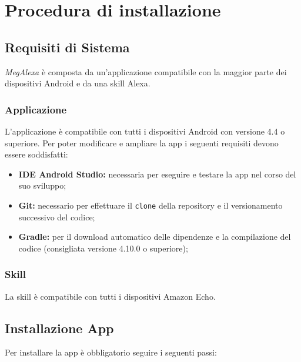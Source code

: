 \chapter{Procedura di installazione}

\section{Requisiti di Sistema}
\label{RequisitSistema}
\textit{MegAlexa} è composta da un'applicazione compatibile con la maggior parte dei dispositivi Android e da una skill Alexa.
\subsection{Applicazione}
L'applicazione è compatibile con tutti i dispositivi Android con versione 4.4 o superiore.
Per poter modificare e ampliare la app i seguenti requisiti devono essere soddisfatti:
\begin{itemize}

	\item \textbf{IDE Android Studio:} necessaria per eseguire e testare la app nel corso del suo sviluppo;
	\item \textbf{Git:} necessario per effettuare il \texttt{clone} della repository e il versionamento successivo del codice;
	\item \textbf{Gradle:} per il download automatico delle dipendenze e la compilazione del codice (consigliata versione 4.10.0 o superiore);

\end{itemize}


\subsection{Skill}
La skill è compatibile con tutti i dispositivi Amazon Echo.

\section{Installazione App} \label{installazioneApp}
Per installare la app è obbligatorio seguire i seguenti passi:

